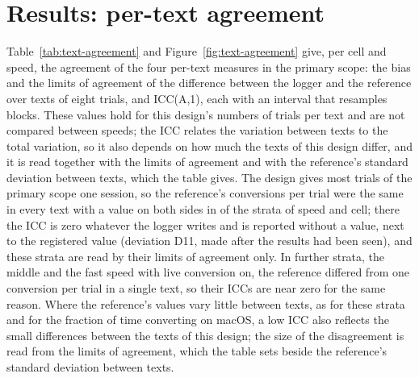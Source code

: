 
\section{Results: per-text agreement}
\label{sec:results-text}

Table~\ref{tab:text-agreement} and Figure~\ref{fig:text-agreement} give, per cell and speed, the agreement of the four
per-text measures in the primary scope: the bias and the limits of agreement of the difference between the logger and
the reference over texts of eight trials, and ICC(A,1), each with an interval that resamples blocks. These values hold
for this design's numbers of trials per text and are not compared between speeds; the ICC relates the variation between
texts to the total variation, so it also depends on how much the texts of this design differ, and it is read together
with the limits of agreement and with the reference's standard deviation between texts, which the table gives. The
design gives most trials of the primary scope one session, so the reference's conversions per trial were the same in
every text with a value on both sides in  of the
 strata of speed and cell; there the ICC is zero whatever the logger writes and
is reported without a value, next to the registered value (deviation D11, made after the results had been seen), and
these strata are read by their limits of agreement only. In  further strata,
the middle and the fast speed with live conversion on, the reference differed from one conversion per trial in a single
text, so their ICCs are near zero for the same reason. Where the reference's values vary little between texts, as for
these strata and for the fraction of time converting on macOS, a low ICC also reflects the small differences between the
texts of this design; the size of the disagreement is read from the limits of agreement, which the table sets beside the
reference's standard deviation between texts.


